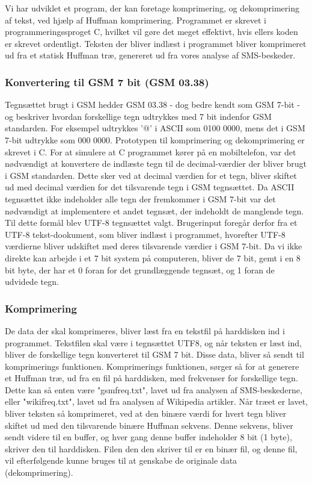 Vi har udviklet et program, der kan foretage komprimering, og dekomprimering af tekst, ved hjælp af Huffman komprimering. Programmet er skrevet i programmeringssproget C, hvilket vil gøre det meget effektivt, hvis ellers koden er skrevet ordentligt.
Teksten der bliver indlæst i programmet bliver komprimeret ud fra et statisk Huffman træ, genereret ud fra vores analyse af SMS-beskeder.


\subsubsection{Konvertering til GSM 7 bit (GSM 03.38)}
Tegnsættet brugt i GSM hedder GSM 03.38 - dog bedre kendt som GSM 7-bit - og beskriver hvordan forskellige tegn udtrykkes med 7 bit indenfor GSM standarden. For eksempel udtrykkes '@' i ASCII som 0100 0000, mens det i GSM 7-bit udtrykke som 000 0000. Prototypen til komprimering og dekomprimering er skrevet i C. For at simulere at C programmet kører på en mobiltelefon, var det nødvændigt at konvertere de indlæste tegn til de decimal-værdier der bliver brugt i GSM standarden. Dette sker ved at decimal værdien for et tegn, bliver skiftet ud med decimal værdien for det tilsvarende tegn i GSM tegnsættet. Da ASCII tegnsættet ikke indeholder alle tegn der fremkommer i GSM 7-bit var det nødvændigt at implementere et andet tegnsæt, der indeholdt de manglende tegn. Til dette formål blev UTF-8 tegnsættet valgt. Brugerinput foregår derfor fra et UTF-8 tekst-dookument, som bliver indlæst i programmet, hvorefter UTF-8 værdierne bliver udskiftet med deres tilsvarende værdier i GSM 7-bit. Da vi ikke direkte kan arbejde i et 7 bit system på computeren, bliver de 7 bit, gemt i en 8 bit byte, der har et 0 foran for det grundlæggende tegnsæt, og 1 foran de udvidede tegn.

\subsubsection{Komprimering}

De data der skal komprimeres, bliver læst fra en tekstfil på harddisken ind i programmet. Tekstfilen skal være i tegnsættet UTF8, og når teksten er læst ind, bliver de forskellige tegn konverteret til GSM 7 bit. Disse data, bliver så sendt til komprimerings funktionen. Komprimerings funktionen, sørger så for at generere et Huffman træ, ud fra en fil på harddisken, med frekvenser for forskellige tegn. Dette kan så enten være "gsmfreq.txt", lavet ud fra analysen af SMS-beskederne, eller "wikifreq.txt", lavet ud fra analysen af Wikipedia artikler.
Når træet er lavet, bliver teksten så komprimeret, ved at den binære værdi for hvert tegn bliver skiftet ud med den tilsvarende binære Huffman sekvens. Denne sekvens, bliver sendt videre til en buffer, og hver gang denne buffer indeholder 8 bit (1 byte), skriver den til harddisken. Filen den den skriver til er en binær fil, og denne fil, vil efterfølgende kunne bruges til at genskabe de originale data (dekomprimering).

